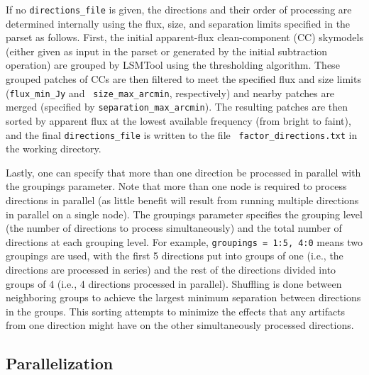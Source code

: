 \documentclass[structabstract]{article}
\begin{document}
If no {\tt directions\_file} is given, the directions and their order of
processing are determined internally using the flux, size, and separation limits
specified in the parset as follows. First, the initial apparent-flux
clean-component (CC) skymodels (either given as input in the parset or generated
by the initial subtraction operation) are grouped by LSMTool using the
thresholding algorithm. These grouped patches of CCs are then filtered to meet
the specified flux and size limits ({\tt flux\_min\_Jy} and {\tt
size\_max\_arcmin}, respectively) and nearby patches are merged (specified by
{\tt separation\_max\_arcmin}). The resulting patches are then sorted by
apparent flux at the lowest available frequency (from bright to faint), and the
final {\tt directions\_file} is written to the file {\tt
factor\_directions.txt} in the working directory.


Lastly, one can specify that more than one direction be processed in parallel
with the groupings parameter. Note that more than one node is required to
process directions in parallel (as little benefit will result from running
multiple directions in parallel on a single node). The groupings parameter
specifies the grouping level (the number of directions to process
simultaneously) and the total number of directions at each grouping level. For
example, {\tt groupings = 1:5, 4:0} means two groupings are used, with the first
5 directions put into groups of one (i.e., the directions are processed in
series) and the rest of the directions divided into groups of 4 (i.e., 4
directions processed in parallel). Shuffling is done between neighboring groups
to achieve the largest minimum separation between directions in the groups. This
sorting attempts to minimize the effects that any artifacts from one direction
might have on the other simultaneously processed directions.


\subsection{Parallelization}
\label{factor:parallel}
\end{document}
